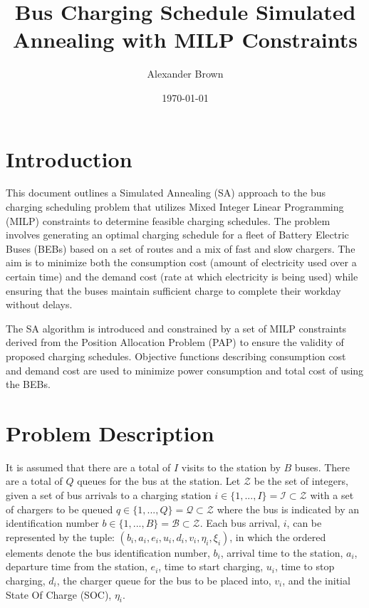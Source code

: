 \documentclass[11pt,a4paper,final]{article}
\author{Alexander Brown}
\date{\today}
\title{Bus Charging Schedule Simulated Annealing with MILP Constraints}
\newcommand{\visit}{(b_i, a_i, e_i, u_i, d_i, v_i, \eta_i, \xi_i)}
\newcommand{\Iset}{\mathcal{I}}             %
\newcommand{\Bset}{\mathcal{B}}             %
\newcommand{\Qset}{\mathcal{Q}}             %
\begin{document}
\maketitle
\tableofcontents

\parskip 3mm                                %
\let\ref\autoref                            %

\section{Introduction}
\label{sec:introduction}
This document outlines a Simulated Annealing (SA) approach to the bus charging scheduling problem that utilizes Mixed
Integer Linear Programming (MILP) constraints to determine feasible charging schedules. The problem involves generating
an optimal charging schedule for a fleet of Battery Electric Buses (BEBs) based on a set of routes and a mix of fast and
slow chargers. The aim is to minimize both the consumption cost (amount of electricity used over a certain time) and the
demand cost (rate at which electricity is being used) while ensuring that the buses maintain sufficient charge to
complete their workday without delays.

The SA algorithm is introduced and constrained by a set of MILP constraints derived from the Position Allocation Problem
(PAP) to ensure the validity of proposed charging schedules. Objective functions describing consumption cost and demand
cost are used to minimize power consumption and total cost of using the BEBs.
\section{Problem Description}
\label{sec:problem-description}
It is assumed that there are a total of \(I\) visits to the station by \(B\) buses. There are a total of \(Q\) queues for the
bus at the station. Let \(\mathcal{Z}\) be the set of integers, given a set of bus arrivals to a charging station \(i \in \{1,..., I\}
= \Iset \subset \mathcal{Z}\) with a set of chargers to be queued \(q \in \{1,..., Q\} = \Qset \subset \mathcal{Z}\) where the bus is indicated by an
identification number \(b \in \{1,..., B\} = \Bset \subset \mathcal{Z}\). Each bus arrival, \(i\), can be represented by the tuple: \(\visit\),
in which the ordered elements denote the bus identification number, \(b_i\), arrival time to the station, \(a_i\), departure
time from the station, \(e_i\), time to start charging, \(u_i\), time to stop charging, \(d_i\), the charger queue for the bus
to be placed into, \(v_i\), and the initial State Of Charge (SOC), \(\eta_i\).
\end{document}
